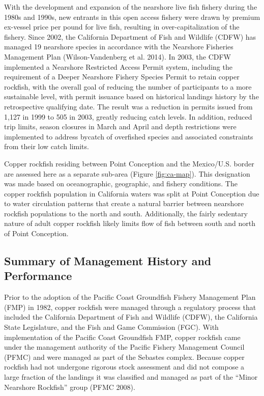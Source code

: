 \documentclass[11pt,
  english,
  letterpaper,
]{article}
\begin{document}
With the development and expansion of the nearshore live fish fishery during the 1980s and 1990s, new entrants in this open access fishery were drawn by premium ex-vessel price per pound for live fish, resulting in over-capitalization of the fishery. Since 2002, the California Department of Fish and Wildlife (CDFW) has managed 19 nearshore species in accordance with the Nearshore Fisheries Management Plan (Wilson-Vandenberg et al. 2014). In 2003, the CDFW implemented a Nearshore Restricted Access Permit system, including the requirement of a Deeper Nearshore Fishery Species Permit to retain copper rockfish, with the overall goal of reducing the number of participants to a more sustainable level, with permit issuance based on historical landings history by the retrospective qualifying date. The result was a reduction in permits issued from 1,127 in 1999 to 505 in 2003, greatly reducing catch levels. In addition, reduced trip limits, season closures in March and April and depth restrictions were implemented to address bycatch of overfished species and associated constraints from their low catch limits.

Copper rockfish residing between Point Conception and the Mexico/U.S. border are assessed here as a separate sub-area (Figure \ref{fig:ca-map}). This designation was made based on oceanographic, geographic, and fishery conditions. The copper rockfish population in California waters was split at Point Conception due to water circulation patterns that create a natural barrier between nearshore rockfish populations to the north and south. Additionally, the fairly sedentary nature of adult copper rockfish likely limits flow of fish between south and north of Point Conception.

\hypertarget{summary-of-management-history-and-performance}{%
\subsection{Summary of Management History and Performance}\label{summary-of-management-history-and-performance}}

Prior to the adoption of the Pacific Coast Groundfish Fishery Management Plan (FMP) in 1982, copper rockfish were managed through a regulatory process that included the California Department of Fish and Wildlife (CDFW), the California State Legislature, and the Fish and Game Commission (FGC). With implementation of the Pacific Coast Groundfish FMP, copper rockfish came under the management authority of the Pacific Fishery Management Council (PFMC) and were managed as part of the Sebastes complex. Because copper rockfish had not undergone rigorous stock assessment and did not compose a large fraction of the landings it was classified and managed as part of the ``Minor Nearshore Rockfish'' group (PFMC 2008).
\end{document}
